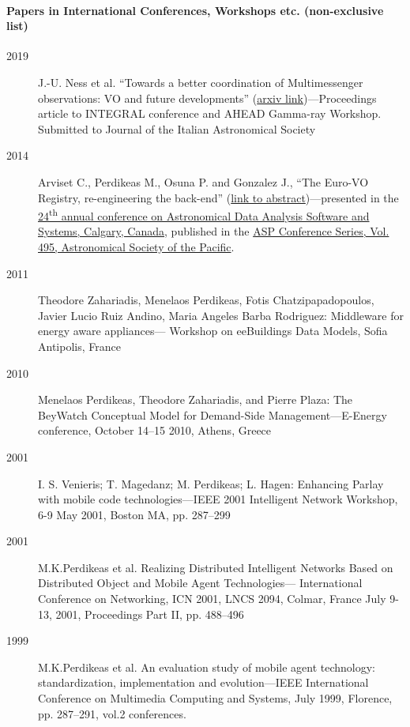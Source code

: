\documentclass[10pt,a4paper]{article} %
\begin{document}
\paragraph{Papers in International Conferences, Workshops etc. (non-exclusive list)}
\begin{description}
\item[2019] J.-U. Ness et al. ``Towards a better coordination of Multimessenger observations: VO and future developments''
  (\href{https://arxiv.org/abs/1903.10732}{arxiv link})---Proceedings article to  INTEGRAL conference and  AHEAD Gamma-ray Workshop. Submitted to Journal of the Italian Astronomical Society
\item[2014] Arviset C., Perdikeas M., Osuna P. and Gonzalez J., ``The Euro-VO Registry, re-engineering the back-end'' (\href{http://adsabs.harvard.edu/abs/2015ASPC..495..457A}{link to abstract})---presented in the \href{http://www.adass2014.org/announcements_en.php}{24\textsuperscript{th} annual conference on Astronomical Data Analysis Software and Systems, Calgary, Canada}, published in the
  \href{http://aspbooks.org/custom/publications/paper/495-0457.html}{ASP Conference Series, Vol. 495, Astronomical Society of the Pacific}.
  
\item[2011] Theodore Zahariadis, Menelaos Perdikeas, Fotis Chatzipapadopoulos, Javier Lucio Ruiz Andino,
  Maria Angeles Barba Rodriguez: Middleware for energy aware appliances--- Workshop on eeBuildings Data Models, Sofia Antipolis, France
\item[2010] Menelaos Perdikeas, Theodore Zahariadis, and Pierre Plaza: The BeyWatch Conceptual Model for Demand-Side Management---E-Energy conference, October 14--15 2010, Athens, Greece
\item[2001] I. S. Venieris; T. Magedanz; M. Perdikeas; L. Hagen: Enhancing Parlay with mobile code technologies---IEEE 2001 Intelligent Network Workshop, 6-9 May 2001, Boston MA, pp. 287--299
\item[2001] M.K.Perdikeas et al. Realizing Distributed Intelligent Networks Based on Distributed Object and Mobile Agent Technologies--- International Conference on Networking, ICN 2001, LNCS 2094, Colmar, France July 9-13, 2001, Proceedings Part II, pp. 488--496
\item[1999] M.K.Perdikeas et al. An evaluation study of mobile agent technology: standardization, implementation and evolution---IEEE International Conference on Multimedia Computing and Systems, July 1999, Florence, pp. 287--291, vol.2
  conferences.
  
\end{description}
\end{document}
